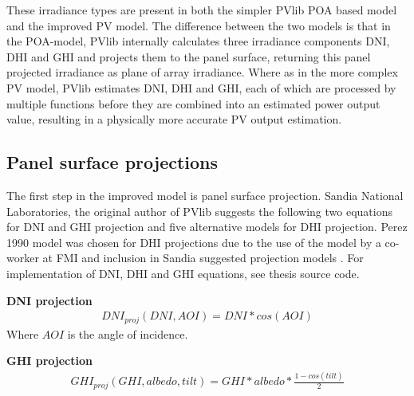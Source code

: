 \noindent
These irradiance types are present in both the simpler PVlib POA based model and the improved PV model. The difference between the two models is that in the POA-model, PVlib internally calculates three irradiance components DNI, DHI and GHI and projects them to the panel surface, returning this panel projected irradiance as plane of array irradiance. Where as in the more complex PV model, PVlib estimates DNI, DHI and GHI, each of which are processed by multiple functions before they are combined into an estimated power output value, resulting in a physically more accurate PV output estimation.

\subsection{Panel surface projections}

The first step in the improved model is panel surface projection. Sandia National Laboratories, the original author of PVlib suggests the following two equations for DNI and GHI projection and five alternative models for DHI projection. Perez 1990 model \cite{perez} was chosen for DHI projections due to the use of the model by a co-worker at FMI and inclusion in Sandia suggested projection models \cite{sandia_poa_dhi}. For implementation of DNI, DHI and GHI equations, see thesis source code.



\noindent\textbf{DNI projection}\cite{sandia_poa_dni}
%
\begin{equation}
\begin{split}
\label{sandia_eq_dni}
DNI_{proj}(DNI, AOI)= DNI*cos(AOI)
\end{split}
\end{equation}
Where $AOI$ is the angle of incidence.


\noindent\textbf{GHI projection}\cite{sandia_poa_ghi}
%
\begin{equation}
\begin{split}
\label{sandia_eq_ghi}
GHI_{proj}(GHI, albedo, tilt)= GHI*albedo*\frac{1-cos(tilt)}{2}
\end{split}
\end{equation}

